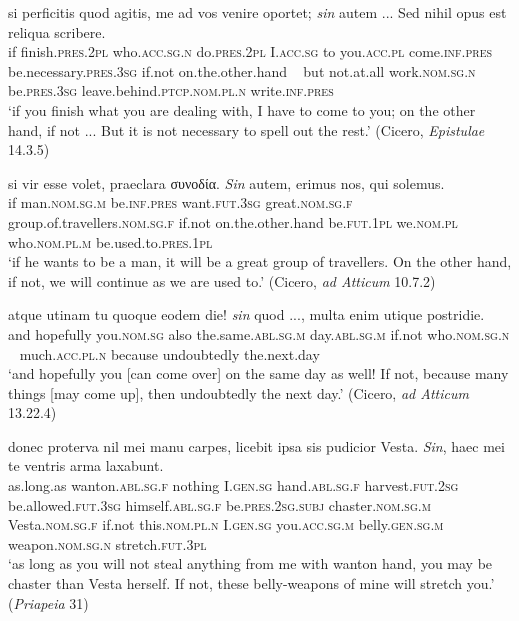 \begin{exe}
\ex
\gll si perficitis quod agitis, me ad vos venire oportet; \emph{sin} autem ... Sed nihil opus est reliqua scribere.\\
if finish.\textsc{pres.2pl} who.\textsc{acc.sg.n} do.\textsc{pres.2pl} I.\textsc{acc.sg} to you.\textsc{acc.pl} come.\textsc{inf.pres} be.necessary.\textsc{pres.3sg} if.not on.the.other.hand ~ but not.at.all work.\textsc{nom.sg.n} be.\textsc{pres.3sg} leave.behind.\textsc{ptcp.nom.pl.n} write.\textsc{inf.pres}\\
\trans `if you finish what you are dealing with, I have to come to you; on the other hand, if not ... But it is not necessary to spell out the rest.' (Cicero, \textit{Epistulae} 14.3.5)
\label{sin3}
\end{exe}

\begin{exe}
\ex
\gll si vir esse volet, praeclara συνοδία. \emph{Sin} autem, erimus nos, qui solemus.\\
if man.\textsc{nom.sg.m} be.\textsc{inf.pres} want.\textsc{fut.3sg} great.\textsc{nom.sg.f} group.of.travellers.\textsc{nom.sg.f} if.not on.the.other.hand be.\textsc{fut.1pl} we.\textsc{nom.pl} who.\textsc{nom.pl.m} be.used.to.\textsc{pres.1pl}\\
\trans `if he wants to be a man, it will be a great group of travellers. On the other hand, if not, we will continue as we are used to.' (Cicero, \textit{ad Atticum} 10.7.2)
\label{sin4}
\end{exe}

\begin{exe}
\ex
\gll atque utinam tu quoque eodem die! \emph{sin} quod ..., multa enim utique postridie.\\
and hopefully you.\textsc{nom.sg} also the.same.\textsc{abl.sg.m} day.\textsc{abl.sg.m} if.not who.\textsc{nom.sg.n} ~ much.\textsc{acc.pl.n} because undoubtedly the.next.day\\
\trans `and hopefully you [can come over] on the same day as well! If not, because many things [may come up], then undoubtedly the next day.' (Cicero, \textit{ad Atticum} 13.22.4)
\label{sin5}
\end{exe}

\begin{exe}
\ex
\gll donec proterva nil mei manu carpes, licebit ipsa sis pudicior Vesta. \emph{Sin}, haec mei te ventris arma laxabunt.\\
as.long.as wanton.\textsc{abl.sg.f} nothing I.\textsc{gen.sg} hand.\textsc{abl.sg.f} harvest.\textsc{fut.2sg} be.allowed.\textsc{fut.3sg} himself.\textsc{abl.sg.f} be.\textsc{pres.2sg.subj} chaster.\textsc{nom.sg.m} Vesta.\textsc{nom.sg.f} if.not this.\textsc{nom.pl.n} I.\textsc{gen.sg} you.\textsc{acc.sg.m} belly.\textsc{gen.sg.m} weapon.\textsc{nom.sg.n} stretch.\textsc{fut.3pl}\\
\trans `as long as you will not steal anything from me with wanton hand, you may be chaster than Vesta herself. If not, these belly-weapons of mine will stretch you.' (\textit{Priapeia} 31)
\label{sin6}
\end{exe}

